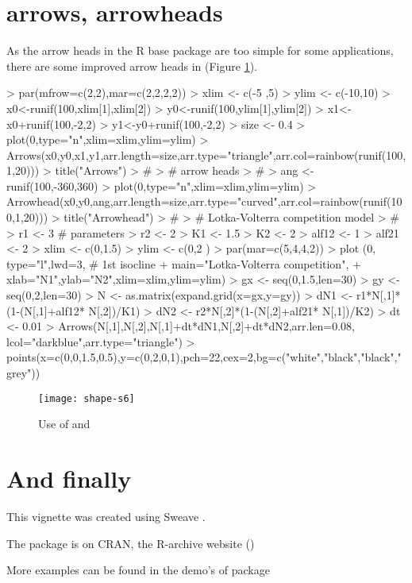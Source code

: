 \documentclass[article,nojss]{jss}
\begin{document}
\section{arrows, arrowheads}
As the arrow heads in the R base package are too simple for some applications,
there are some improved arrow heads in  (Figure \ref{fig:s6}).
\begin{Schunk}
\begin{Sinput}
> par(mfrow=c(2,2),mar=c(2,2,2,2))
> xlim <- c(-5 ,5)
> ylim <- c(-10,10)
> x0<-runif(100,xlim[1],xlim[2])
> y0<-runif(100,ylim[1],ylim[2])
> x1<-x0+runif(100,-2,2)
> y1<-y0+runif(100,-2,2)
> size <- 0.4
> plot(0,type="n",xlim=xlim,ylim=ylim)
> Arrows(x0,y0,x1,y1,arr.length=size,arr.type="triangle",arr.col=rainbow(runif(100,1,20)))
> title("Arrows")
> #
> # arrow heads
> #
> ang  <- runif(100,-360,360)
> plot(0,type="n",xlim=xlim,ylim=ylim)
> Arrowhead(x0,y0,ang,arr.length=size,arr.type="curved",arr.col=rainbow(runif(100,1,20)))
> title("Arrowhead")
> #
> # Lotka-Volterra competition model
> #
> r1    <- 3              # parameters
> r2    <- 2
> K1    <- 1.5
> K2    <- 2
> alf12 <- 1
> alf21 <- 2
> xlim   <- c(0,1.5)
> ylim   <- c(0,2  )
> par(mar=c(5,4,4,2))
> plot  (0, type="l",lwd=3,   # 1st isocline
+        main="Lotka-Volterra competition",
+        xlab="N1",ylab="N2",xlim=xlim,ylim=ylim)
> gx <- seq(0,1.5,len=30)
> gy <- seq(0,2,len=30)
> N  <- as.matrix(expand.grid(x=gx,y=gy))
> dN1 <- r1*N[,1]*(1-(N[,1]+alf12* N[,2])/K1)
> dN2 <- r2*N[,2]*(1-(N[,2]+alf21* N[,1])/K2)
> dt  <- 0.01
> Arrows(N[,1],N[,2],N[,1]+dt*dN1,N[,2]+dt*dN2,arr.len=0.08, lcol="darkblue",arr.type="triangle")
> points(x=c(0,0,1.5,0.5),y=c(0,2,0,1),pch=22,cex=2,bg=c("white","black","black","grey"))
\end{Sinput}
\end{Schunk}
\begin{figure}
\begin{center}
\texttt{[image: shape-s6]}
\end{center}
\caption{Use of  and  }
\label{fig:s6}
\end{figure}


\section{And finally}

This vignette was created using Sweave \citep{Leisch02}.

The package is on CRAN, the R-archive website (\citep{R2008})

More examples can be found in the demo's of package  \citep{Soetaert08e}


\end{document}

